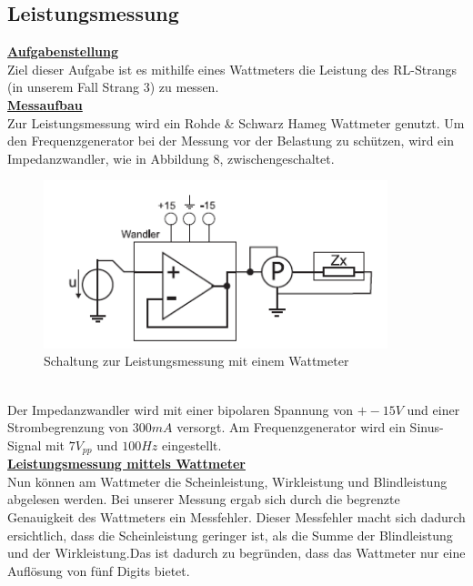 \documentclass[a4paper,12pt]{article}
\begin{document}
	\subsection{Leistungsmessung}
	\underline{\textbf{Aufgabenstellung}} \\ \newline
	\noindent
	Ziel dieser Aufgabe ist es mithilfe eines Wattmeters die Leistung des RL-Strangs (in unserem Fall Strang 3) zu messen.\\ \newline
	\noindent
	\underline{\textbf{Messaufbau}}\\ \newline
	Zur Leistungsmessung wird ein Rohde \& Schwarz Hameg Wattmeter genutzt.
	Um den Frequenzgenerator bei der Messung vor der Belastung zu schützen, wird ein Impedanzwandler, wie in Abbildung 8, zwischengeschaltet.\\ \newline
	\begin{figure}[h]
		\centering
		\includegraphics[width=10cm]{assets/leistungsmessung}
		\caption{Schaltung zur Leistungsmessung mit einem Wattmeter}
	\end{figure} \\ \newline
	Der Impedanzwandler wird mit einer bipolaren Spannung von $+-15V$ und einer Strombegrenzung von $300mA$ versorgt. Am Frequenzgenerator wird ein Sinus-Signal mit $7 V_{pp}$ und $100Hz$ eingestellt.\\ \newline
	\noindent
	\underline{\textbf{Leistungsmessung mittels Wattmeter}}\\ \newline
	Nun können am Wattmeter die Scheinleistung, Wirkleistung und Blindleistung abgelesen werden.\newline
	Bei unserer Messung ergab sich durch die begrenzte Genauigkeit des Wattmeters ein Messfehler. Dieser Messfehler macht sich dadurch ersichtlich, dass die Scheinleistung geringer ist, als die Summe der Blindleistung und der Wirkleistung.\newline Das ist dadurch zu begründen, dass das Wattmeter nur eine Auflösung von fünf Digits bietet.\newline
\end{document}
